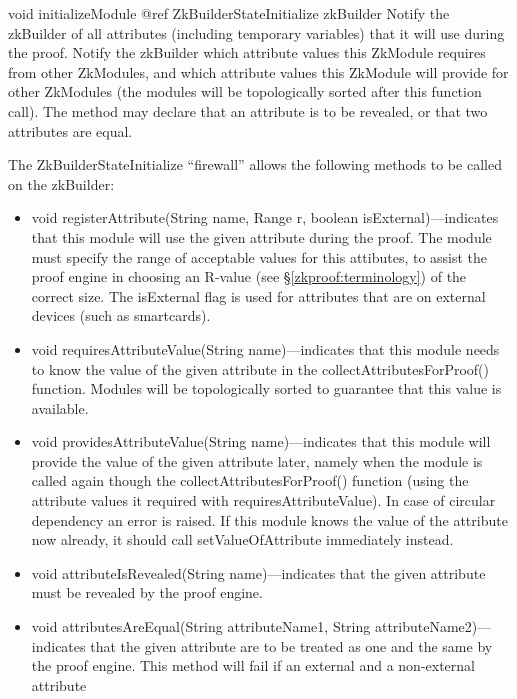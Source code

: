     \begin{method}
    {void}
    {initializeModule}
    {
      {@ref ZkBuilderStateInitialize zkBuilder}
    }
    Notify the zkBuilder of all attributes (including temporary variables) that it will use during the proof.
    Notify the zkBuilder which attribute values this ZkModule requires from other ZkModules, and which attribute values this ZkModule
    will provide for other ZkModules (the modules will be topologically sorted after this function call).
    The method may declare that an attribute is to be revealed, or that two attributes are equal.

    The ZkBuilderStateInitialize ``firewall'' allows the following methods to be called on the zkBuilder:
      \begin{itemize}
      \item void registerAttribute(String name, Range r, boolean isExternal)---indicates that this module will use the
       given attribute during the proof.
       The module must specify the range of acceptable values for this attibutes, to assist the proof engine in
       choosing an R-value (see §\ref{zkproof:terminology}) of the correct size.
       The isExternal flag is used for attributes that are on external devices (such as
       smartcards).
      \item void requiresAttributeValue(String name)---indicates that this module needs to know the value of the given attribute
       in the collectAttributesForProof() function. Modules will be topologically sorted to guarantee that this value is available.
      \item void providesAttributeValue(String name)---indicates that this module will provide the value of the given attribute
       later, namely when the module is called again though the collectAttributesForProof() function
       (using the attribute values it required with requiresAttributeValue).
       In case of circular dependency an error is raised. If this
       module knows the value of the attribute now already, it should call setValueOfAttribute
       immediately instead.
      \item void attributeIsRevealed(String name)---indicates that the given attribute must be revealed by the proof engine.
      \item void attributesAreEqual(String attributeName1, String attributeName2)---indicates that the given attribute are
        to be treated as one and the same by the proof engine. This method will fail if an external and a non-external attribute

\end{itemize}
\end{method}
